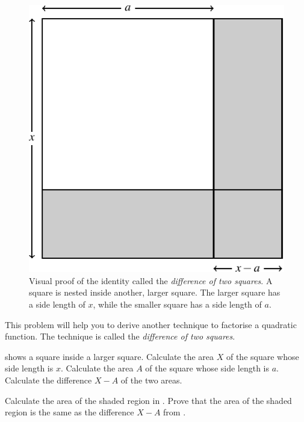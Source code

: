 \documentclass[a4paper,oneside,12pt]{article}
\begin{document}
\begin{problem}
\begin{figure}[!htbp]
\centering
\includegraphics[scale=1.1]{image/10/difference-two-squares.pdf}
\caption{%
  Visual proof of the identity called the
  \emph{difference of two squares}.  A square is nested inside
  another, larger square.  The larger square has a side length of $x$,
  while the smaller square has a side length of $a$.
}
\label{fig:difference_two_squares}
\end{figure}

\item\label{prob:difference_of_two_squares}
  This problem will help you to derive another technique to factorise
  a quadratic function.  The technique is called the
  \emph{difference of two squares}.
  \begin{packedenum}
  \item\label{subprob:difference_two_squares_areas_squares}
     shows a square inside a larger
    square.  Calculate the area $X$ of the square whose side length is
    $x$.  Calculate the area $A$ of the square whose side length is
    $a$.  Calculate the difference $X - A$ of the two areas.

  \item\label{subprob:difference_two_squares_area_shaded}
    Calculate the area of the shaded region in
    .  Prove that the area of the
    shaded region is the same as the difference $X - A$
    from .


\end{packedenum}
\end{problem}
\end{document}
